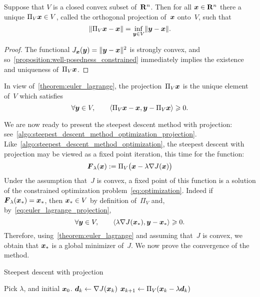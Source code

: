\begin{proposition}
    Suppose that $V$ is a closed convex subset of~$\mathbf R^n$.
    Then for all $\mathbf{\boldsymbol{x}} \in \mathbf R^n$ there a unique $\Pi_V \mathbf{\boldsymbol{x}} \in V$,
    called the orthogonal projection of~$\mathbf{\boldsymbol{x}}$ onto~$V$,
    such that
    \[
        \lVert\Pi_V \mathbf{\boldsymbol{x}} - \mathbf{\boldsymbol{x}}\rVert = \inf_{\mathbf{\boldsymbol{y}} \in V} \lVert\mathbf{\boldsymbol{y}} - \mathbf{\boldsymbol{x}}\rVert.
    \]
\end{proposition}
\begin{proof}
    The functional $J_{\mathbf{\boldsymbol{x}}}(\mathbf{\boldsymbol{y}}) = \lVert\mathbf{\boldsymbol{y}} - \mathbf{\boldsymbol{x}}\rVert^2$ is strongly convex,
    and so~\cref{proposition:well-posedness_constrained} immediately implies the existence and uniqueness of~$\Pi_V \mathbf{\boldsymbol{x}}$.
\end{proof}

\begin{remark}
    In view of~\cref{theorem:euler_lagrange},
    the projection~$\Pi_V \mathbf{\boldsymbol{x}}$ is the unique element of~$V$ which satisfies
    \begin{equation}
        \label{eq:euler_lagrange_projection}
        \forall \mathbf{\boldsymbol{y}} \in V,
        \qquad \langle\Pi_V \mathbf{\boldsymbol{x}} - \mathbf{\boldsymbol{x}}, \mathbf{\boldsymbol{y}} - \Pi_V\mathbf{\boldsymbol{x}}\rangle \geqslant 0.
    \end{equation}
\end{remark}

We are now ready to present the steepest descent method with projection:
see~\cref{algo:steepest_descent_method_optimization_projection}.
Like~\cref{algo:steepest_descent_method_optimization},
the steepest descent with projection may be viewed as a fixed point iteration,
this time for the function:
\[
    \mathbf{\boldsymbol{F}}_{\lambda}(\mathbf{\boldsymbol{x}}) := \Pi_V\bigl(\mathbf{\boldsymbol{x}} - \lambda \nabla J(\mathbf{\boldsymbol{x}})\bigr)
\]
Under the assumption that~$J$ is convex,
a fixed point of this function is a solution of the constrained optimization problem~\eqref{eq:optimization}.
Indeed if~$\mathbf{\boldsymbol{F}}_{\lambda}(\mathbf{\boldsymbol{x}}_*) = \mathbf{\boldsymbol{x}}_*$,
then $\mathbf{\boldsymbol{x}}_* \in V$ by definition of~$\Pi_V$ and, by~\eqref{eq:euler_lagrange_projection},
\[
    \forall \mathbf{\boldsymbol{y}} \in V,
    \qquad \langle\lambda \nabla J(\mathbf{\boldsymbol{x}}_*), \mathbf{\boldsymbol{y}} - \mathbf{\boldsymbol{x}}_*\rangle \geqslant 0.
\]
Therefore, using~\cref{theorem:euler_lagrange} and assuming that~$J$ is convex,
we obtain that $\mathbf{\boldsymbol{x}}_*$ is a global minimizer of~$J$.
We now prove the convergence of the method.
\begin{algorithm}
\caption{Steepest descent with projection}%
\label{algo:steepest_descent_method_optimization_projection}%
\begin{algorithmic}[1]
    \State Pick $\lambda$, and initial $\mathbf{\boldsymbol{x}}_0$.
        \State $\mathbf{\boldsymbol{d}}_k \gets \nabla J(\mathbf{\boldsymbol{x}}_k)$
        \State $\mathbf{\boldsymbol{x}}_{k+1} \gets \Pi_V(\mathbf{\boldsymbol{x}}_{k} - \lambda \mathbf{\boldsymbol{d}}_k)$
    \EndFor
\end{algorithmic}
\end{algorithm}

